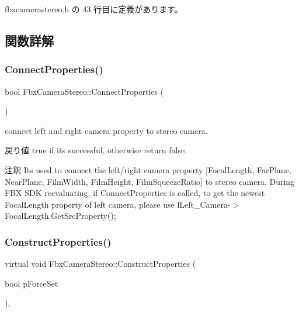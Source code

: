  fbxcamerastereo.\+h の 43 行目に定義があります。



\subsection{関数詳解}
\mbox{\label{class_fbx_camera_stereo_a00d710d453a4cad2f7f93199ff68ee17}} 
\subsubsection{\texorpdfstring{Connect\+Properties()}{ConnectProperties()}}
{\footnotesize\ttfamily bool Fbx\+Camera\+Stereo\+::\+Connect\+Properties (\begin{DoxyParamCaption}{ }\end{DoxyParamCaption})}

connect left and right camera property to stereo camera. \begin{DoxyReturn}{戻り値}
true if it\textquotesingle{}s successful, otherwise return false. 
\end{DoxyReturn}
\begin{DoxyRemark}{注釈}
It\textquotesingle{}s used to connect the left/right camera property \mbox{[}Focal\+Length, Far\+Plane, Near\+Plane, Film\+Width, Film\+Height, Film\+Squeeze\+Ratio\mbox{]} to stereo camera. During F\+BX S\+DK reevaluating, if Connect\+Properties is called, to get the newest Focal\+Length property of left camera, please use l\+Left\+\_\+\+Camera-\/$>$Focal\+Length.\+Get\+Src\+Property(); 
\end{DoxyRemark}
\mbox{\label{class_fbx_camera_stereo_a83a9b1ee59d0014b30411fe4877b5dec}} 
\subsubsection{\texorpdfstring{Construct\+Properties()}{ConstructProperties()}}
{\footnotesize\ttfamily virtual void Fbx\+Camera\+Stereo\+::\+Construct\+Properties (\begin{DoxyParamCaption}\item[{bool}]{p\+Force\+Set }\end{DoxyParamCaption})\hspace{0.3cm}{\ttfamily [protected]}, {\ttfamily [virtual]}}

